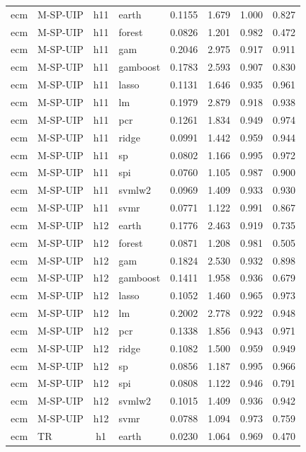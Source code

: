 \begin{ThreePartTable}
\begin{longtable}[t]{llclcccc}
ecm & M-SP-UIP & h11 & earth & 0.1155 & 1.679 & 1.000 & 0.827\\
ecm & M-SP-UIP & h11 & forest & 0.0826 & 1.201 & 0.982 & 0.472\\
ecm & M-SP-UIP & h11 & gam & 0.2046 & 2.975 & 0.917 & 0.911\\
ecm & M-SP-UIP & h11 & gamboost & 0.1783 & 2.593 & 0.907 & 0.830\\
ecm & M-SP-UIP & h11 & lasso & 0.1131 & 1.646 & 0.935 & 0.961\\
ecm & M-SP-UIP & h11 & lm & 0.1979 & 2.879 & 0.918 & 0.938\\
ecm & M-SP-UIP & h11 & pcr & 0.1261 & 1.834 & 0.949 & 0.974\\
ecm & M-SP-UIP & h11 & ridge & 0.0991 & 1.442 & 0.959 & 0.944\\
ecm & M-SP-UIP & h11 & sp & 0.0802 & 1.166 & 0.995 & 0.972\\
ecm & M-SP-UIP & h11 & spi & 0.0760 & 1.105 & 0.987 & 0.900\\
ecm & M-SP-UIP & h11 & svmlw2 & 0.0969 & 1.409 & 0.933 & 0.930\\
ecm & M-SP-UIP & h11 & svmr & 0.0771 & 1.122 & 0.991 & 0.867\\
\addlinespace
ecm & M-SP-UIP & h12 & earth & 0.1776 & 2.463 & 0.919 & 0.735\\
ecm & M-SP-UIP & h12 & forest & 0.0871 & 1.208 & 0.981 & 0.505\\
ecm & M-SP-UIP & h12 & gam & 0.1824 & 2.530 & 0.932 & 0.898\\
ecm & M-SP-UIP & h12 & gamboost & 0.1411 & 1.958 & 0.936 & 0.679\\
ecm & M-SP-UIP & h12 & lasso & 0.1052 & 1.460 & 0.965 & 0.973\\
ecm & M-SP-UIP & h12 & lm & 0.2002 & 2.778 & 0.922 & 0.948\\
ecm & M-SP-UIP & h12 & pcr & 0.1338 & 1.856 & 0.943 & 0.971\\
ecm & M-SP-UIP & h12 & ridge & 0.1082 & 1.500 & 0.959 & 0.949\\
ecm & M-SP-UIP & h12 & sp & 0.0856 & 1.187 & 0.995 & 0.966\\
ecm & M-SP-UIP & h12 & spi & 0.0808 & 1.122 & 0.946 & 0.791\\
ecm & M-SP-UIP & h12 & svmlw2 & 0.1015 & 1.409 & 0.936 & 0.942\\
ecm & M-SP-UIP & h12 & svmr & 0.0788 & 1.094 & 0.973 & 0.759\\
\addlinespace
ecm & TR & h1 & earth & 0.0230 & 1.064 & 0.969 & 0.470\\

\end{longtable}
\end{ThreePartTable}

